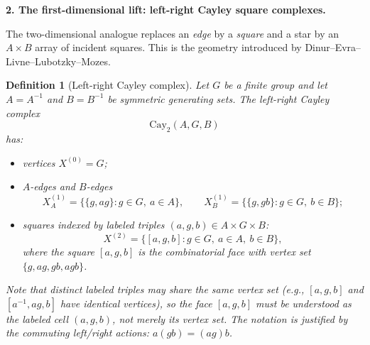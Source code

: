 \documentclass[10pt]{article}
\theoremstyle{compactdef}
\newtheorem{definition}{Definition}
\begin{document}
\textbf{2. The first-dimensional lift: left-right Cayley square complexes.}

The two-dimensional analogue replaces an \emph{edge} by a \emph{square} and a star by an $A\times B$ array of incident squares. This is the geometry introduced by Dinur--Evra--Livne--Lubotzky--Mozes.~\cite{DELLM}

\begin{definition}[Left-right Cayley complex]
Let $G$ be a finite group and let $A=A^{-1}$ and $B=B^{-1}$ be symmetric generating sets. The left-right Cayley complex
\[
\mathrm{Cay}_2(A,G,B)
\]
has:
\begin{itemize}
\item vertices $X^{(0)}=G$;
\item $A$-edges and $B$-edges
\[
X_A^{(1)}=\bigl\{\{g,ag\}:g\in G,\ a\in A\bigr\},\qquad
X_B^{(1)}=\bigl\{\{g,gb\}:g\in G,\ b\in B\bigr\};
\]
\item squares indexed by labeled triples $(a,g,b)\in A\times G\times B$:
\[
X^{(2)}=\bigl\{[a,g,b]:g\in G,\ a\in A,\ b\in B\bigr\},
\]
where the square $[a,g,b]$ is the combinatorial face with vertex set $\{g,ag,gb,agb\}$.
\end{itemize}
Note that distinct labeled triples may share the same vertex set (e.g., $[a,g,b]$ and $[a^{-1},ag,b]$ have identical vertices), so the face $[a,g,b]$ must be understood as the labeled cell $(a,g,b)$, not merely its vertex set.
The notation is justified by the commuting left/right actions: $a(gb)=(ag)b$.~\cite{DELLM}
\end{definition}
\end{document}
